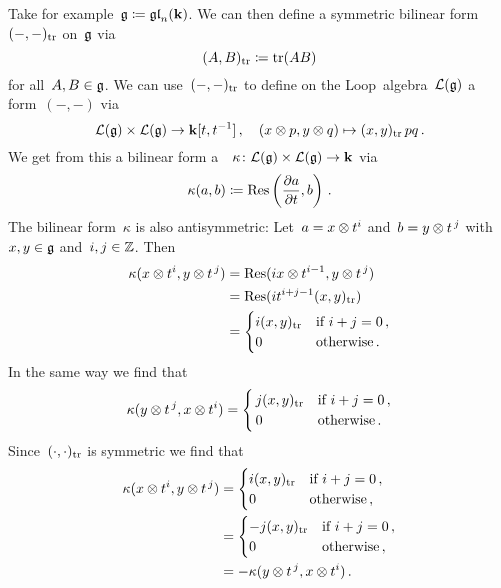 \begin{example}
  Take for example~$\mathfrak{g} \coloneqq \mathfrak{gl}_n(\mathbf{k})$.
  We can then define a symmetric bilinear form~$(-,-)_{\operatorname{tr}}$ on~$\mathfrak{g}$ via
  \[
    (A,B)_{\operatorname{tr}}
    \coloneqq
    \operatorname{tr}(AB)
  \]
  for all~$A, B \in \mathfrak{g}$.
  We can use~$(-,-)_{\operatorname{tr}}$ to define on the Loop~algebra~$\mathcal{L}(\mathfrak{g})$ a~{\bilinear{$\kf[t,t^{-1}]$}} form~$(-,-)$ via
  \[
    \mathcal{L}(\mathfrak{g}) \times \mathcal{L}(\mathfrak{g})
    \to
    \mathbf{k}[t,t^{-1}] \,,
    \quad
    (x \otimes p, y \otimes q)
    \mapsto
    (x,y)_{\operatorname{tr}} \, pq \,.
  \]
  We get from this a bilinear form a~{\twococycle}~$\kappa \colon \mathcal{L}(\mathfrak{g}) \times \mathcal{L}(\mathfrak{g}) \to \mathbf{k}$ via
  \[
    \kappa(a,b)
    \coloneqq
    \operatorname{Res}\left( \frac{\partial a}{\partial t}, b \right) \,.
  \]
  The bilinear form~$\kappa$ is also antisymmetric:
  Let~$a = x \otimes t^i$ and~$b = y \otimes t^{\, j}$ with~$x,y \in \mathfrak{g}$ and~$i,j \in \mathbb{Z}$.
  Then
  \begin{align*}
    \kappa(x \otimes t^i, y \otimes t^{\, j})
    &=
    \operatorname{Res}(i x \otimes t^{i-1}, y \otimes t^{\, j})
    \\
    &= 
    \operatorname{Res}(i t^{i+j-1} (x,y)_{\operatorname{tr}})
    \\
    &=
    \begin{cases}
      i (x,y)_{\operatorname{tr}} & \text{if~$i+j = 0$} \,,\\
                  0 & \text{otherwise}  \,.
    \end{cases}
  \end{align*}
  In the same way we find that
  \[
    \kappa(y \otimes t^{\, j}, x \otimes t^i)
    =
    \begin{cases}
      \,  j (x,y)_{\operatorname{tr}} & \text{if~$i+j = 0$} \,, \\
      \,              0 & \text{otherwise}  \,.
    \end{cases}
  \]
  Since~$(\cdot,\cdot)_{\operatorname{tr}}$ is symmetric we find that
  \begin{align*}
    \kappa(x \otimes t^i, y \otimes t^{\, j})
    &=
    \begin{cases}
    i (x,y)_{\operatorname{tr}} & \text{if~$i+j = 0$} \,, \\
                0 & \text{otherwise}  \,,
    \end{cases} \\
    &=
    \begin{cases}
    -j (x,y)_{\operatorname{tr}} & \text{if~$i+j = 0$}  \,, \\
                  0 & \text{otherwise}  \,,
    \end{cases} \\
    &=
    -\kappa(y \otimes t^{\, j}, x \otimes t^i) \,.
  \end{align*}
\end{example}


